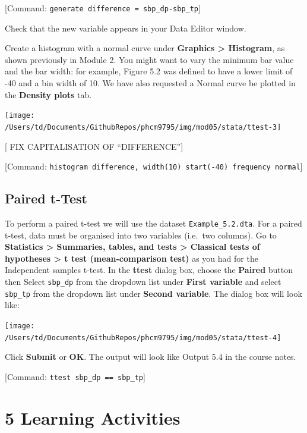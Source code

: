 \documentclass[
]{memoir}
\begin{document}
{[}Command: \texttt{generate\ difference\ =\ sbp\_dp-sbp\_tp}{]}

Check that the new variable appears in your Data Editor window.

Create a histogram with a normal curve under \textbf{Graphics \textgreater{} Histogram}, as shown previously in Module 2. You might want to vary the minimum bar value and the bar width: for example, Figure 5.2 was defined to have a lower limit of -40 and a bin width of 10. We have also requested a Normal curve be plotted in the \textbf{Density plots} tab.

\texttt{[image: /Users/td/Documents/GithubRepos/phcm9795/img/mod05/stata/ttest-3]}

{[} FIX CAPITALISATION OF ``DIFFERENCE''{]}

{[}Command: \texttt{histogram\ difference,\ width(10)\ start(-40)\ frequency\ normal}{]}

\hypertarget{paired-t-test}{%
\section{Paired t-Test}\label{paired-t-test}}

To perform a paired t-test we will use the dataset \texttt{Example\_5.2.dta}. For a paired t-test, data must be organised into two variables (i.e.~two columns). Go to \textbf{Statistics \textgreater{} Summaries, tables, and tests \textgreater{} Classical tests of hypotheses \textgreater{} t test (mean-comparison test)} as you had for the Independent samples t-test. In the \textbf{ttest} dialog box, choose the \textbf{Paired} button then Select \texttt{sbp\_dp} from the dropdown list under \textbf{First variable} and select \texttt{sbp\_tp} from the dropdown list under \textbf{Second variable}. The dialog box will look like:

\texttt{[image: /Users/td/Documents/GithubRepos/phcm9795/img/mod05/stata/ttest-4]}

Click \textbf{Submit} or \textbf{OK}. The output will look like Output 5.4 in the course notes.

{[}Command: \texttt{ttest\ sbp\_dp\ ==\ sbp\_tp}{]}

\hypertarget{learning-activities-4}{%
\chapter*{\texorpdfstring{\textbf{5} Learning Activities}{5 Learning Activities}}\label{learning-activities-4}}
\end{document}
